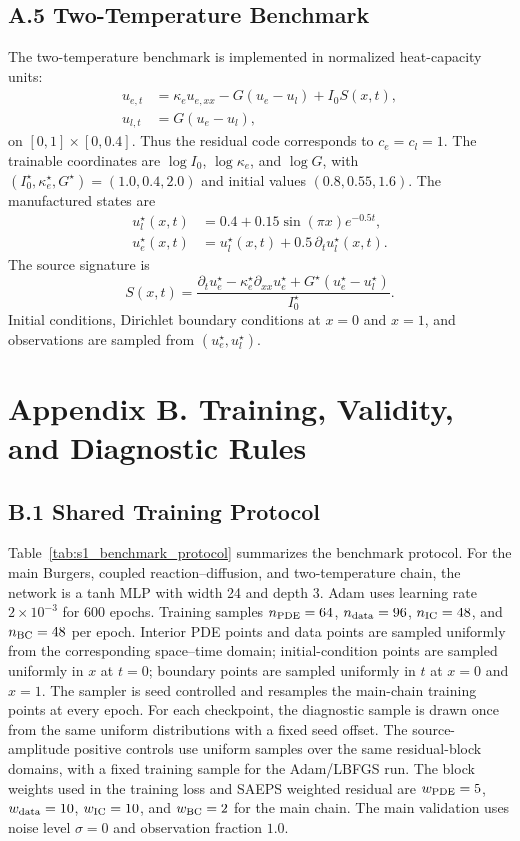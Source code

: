 \documentclass[preprint,12pt]{elsarticle}
\begin{document}
\subsection*{A.5 Two-Temperature Benchmark}

The two-temperature benchmark is implemented in normalized heat-capacity units:
\begin{align}
    u_{e,t}&=\kappa_e u_{e,xx}-G(u_e-u_l)+I_0S(x,t),\\
    u_{l,t}&=G(u_e-u_l),
\end{align}
on $[0,1]\times[0,0.4]$.  Thus the residual code corresponds to $c_e=c_l=1$.  The trainable coordinates are $\log I_0$, $\log\kappa_e$, and $\log G$, with $(I_0^\star,\kappa_e^\star,G^\star)=(1.0,0.4,2.0)$ and initial values $(0.8,0.55,1.6)$.  The manufactured states are
\begin{align}
    u_l^\star(x,t)&=0.4+0.15\sin(\pi x)e^{-0.5t},\\
    u_e^\star(x,t)&=u_l^\star(x,t)+0.5\,\partial_t u_l^\star(x,t).
\end{align}
The source signature is
\begin{equation}
    S(x,t)=\frac{\partial_t u_e^\star-\kappa_e^\star \partial_{xx}u_e^\star+G^\star(u_e^\star-u_l^\star)}{I_0^\star}.
\end{equation}
Initial conditions, Dirichlet boundary conditions at $x=0$ and $x=1$, and observations are sampled from $(u_e^\star,u_l^\star)$.

\section*{Appendix B. Training, Validity, and Diagnostic Rules}

\subsection*{B.1 Shared Training Protocol}

Table~\ref{tab:s1_benchmark_protocol} summarizes the benchmark protocol.  For the main Burgers, coupled reaction--diffusion, and two-temperature chain, the network is a tanh MLP with width 24 and depth 3.  Adam uses learning rate $2\times10^{-3}$ for 600 epochs.  Training samples $n_{\rm PDE}=64$, $n_{\rm data}=96$, $n_{\rm IC}=48$, and $n_{\rm BC}=48$ per epoch.  Interior PDE points and data points are sampled uniformly from the corresponding space--time domain; initial-condition points are sampled uniformly in $x$ at $t=0$; boundary points are sampled uniformly in $t$ at $x=0$ and $x=1$.  The sampler is seed controlled and resamples the main-chain training points at every epoch.  For each checkpoint, the diagnostic sample is drawn once from the same uniform distributions with a fixed seed offset.  The source-amplitude positive controls use uniform samples over the same residual-block domains, with a fixed training sample for the Adam/LBFGS run.  The block weights used in the training loss and SAEPS weighted residual are $w_{\rm PDE}=5$, $w_{\rm data}=10$, $w_{\rm IC}=10$, and $w_{\rm BC}=2$ for the main chain.  The main validation uses noise level $\sigma=0$ and observation fraction $1.0$.
\end{document}
